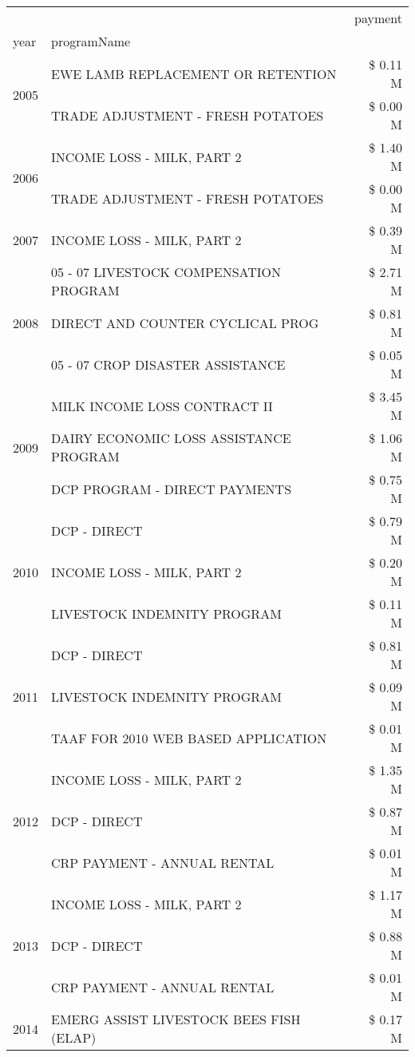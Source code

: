\begin{tabular}{llr}
\toprule
 &  & payment \\
year & programName &  \\
\midrule
\multirow[t]{2}{*}{2005} & EWE LAMB REPLACEMENT OR RETENTION & \$ 0.11 M \\
 & TRADE ADJUSTMENT - FRESH POTATOES & \$ 0.00 M \\
\cline{1-3}
\multirow[t]{2}{*}{2006} & INCOME LOSS - MILK, PART 2 & \$ 1.40 M \\
 & TRADE ADJUSTMENT - FRESH POTATOES & \$ 0.00 M \\
\cline{1-3}
2007 & INCOME LOSS - MILK, PART 2 & \$ 0.39 M \\
\cline{1-3}
\multirow[t]{3}{*}{2008} & 05 - 07 LIVESTOCK COMPENSATION PROGRAM & \$ 2.71 M \\
 & DIRECT AND COUNTER CYCLICAL PROG & \$ 0.81 M \\
 & 05 - 07 CROP DISASTER ASSISTANCE & \$ 0.05 M \\
\cline{1-3}
\multirow[t]{3}{*}{2009} & MILK INCOME LOSS CONTRACT II & \$ 3.45 M \\
 & DAIRY ECONOMIC LOSS ASSISTANCE PROGRAM & \$ 1.06 M \\
 & DCP PROGRAM - DIRECT PAYMENTS & \$ 0.75 M \\
\cline{1-3}
\multirow[t]{3}{*}{2010} & DCP - DIRECT & \$ 0.79 M \\
 & INCOME LOSS - MILK, PART 2 & \$ 0.20 M \\
 & LIVESTOCK INDEMNITY PROGRAM & \$ 0.11 M \\
\cline{1-3}
\multirow[t]{3}{*}{2011} & DCP - DIRECT & \$ 0.81 M \\
 & LIVESTOCK INDEMNITY PROGRAM & \$ 0.09 M \\
 & TAAF FOR 2010 WEB BASED APPLICATION & \$ 0.01 M \\
\cline{1-3}
\multirow[t]{3}{*}{2012} & INCOME LOSS - MILK, PART 2 & \$ 1.35 M \\
 & DCP - DIRECT & \$ 0.87 M \\
 & CRP PAYMENT - ANNUAL RENTAL & \$ 0.01 M \\
\cline{1-3}
\multirow[t]{3}{*}{2013} & INCOME LOSS - MILK, PART 2 & \$ 1.17 M \\
 & DCP - DIRECT & \$ 0.88 M \\
 & CRP PAYMENT - ANNUAL RENTAL & \$ 0.01 M \\
\cline{1-3}
\multirow[t]{3}{*}{2014} & EMERG ASSIST LIVESTOCK BEES FISH (ELAP) & \$ 0.17 M \\

\end{tabular}

